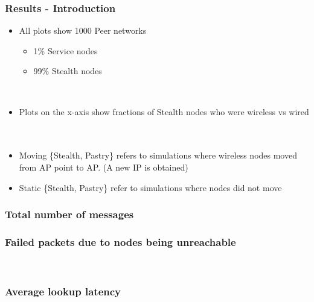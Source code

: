 \documentclass{beamer}
\begin{document}
\begin{frame}
  \frametitle{Results - Introduction}
  \begin{itemize}
    \item All plots show 1000 Peer networks
    \begin{itemize}
        \item 1\% Service nodes
        \item 99\% Stealth nodes
    \end{itemize}
    ~\\
    \item Plots on the x-axis show fractions of Stealth nodes who were wireless vs wired
    ~\\~\\
    \item Moving \{Stealth, Pastry\} refers to simulations where wireless nodes
    moved from AP point to AP. (A new IP is obtained)
    \item Static \{Stealth, Pastry\} refer to simulations where nodes
    did not move
  \end{itemize}
\end{frame}

\begin{frame}
  \frametitle{Total number of messages}
  \begin{center}
  \end{center}
\end{frame}

\begin{frame}
  \frametitle{Failed packets due to nodes being unreachable}

  \begin{center}
    \\
  \end{center}

\end{frame}

\begin{frame}
  \frametitle{Average lookup latency}

  \begin{center}
    \\
  \end{center}

\end{frame}
\end{document}
